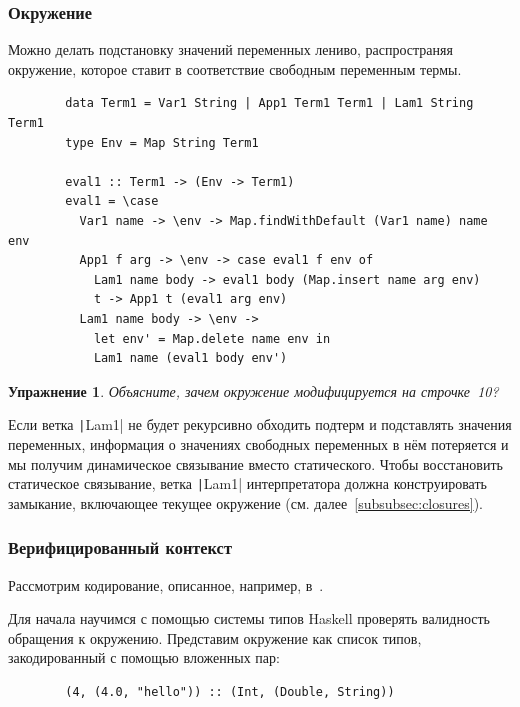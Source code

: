 \documentclass[12pt]{article}
\newtheorem{task}{Упражнение}
\begin{document}
    \subsubsection{Окружение}

    Можно делать подстановку значений переменных лениво, распространяя окружение, которое ставит в соответствие свободным переменным термы.

    \begin{verbatim}
        data Term1 = Var1 String | App1 Term1 Term1 | Lam1 String Term1
        type Env = Map String Term1

        eval1 :: Term1 -> (Env -> Term1)
        eval1 = \case
          Var1 name -> \env -> Map.findWithDefault (Var1 name) name env
          App1 f arg -> \env -> case eval1 f env of
            Lam1 name body -> eval1 body (Map.insert name arg env)
            t -> App1 t (eval1 arg env)
          Lam1 name body -> \env ->
            let env' = Map.delete name env in
            Lam1 name (eval1 body env')
    \end{verbatim}

    \begin{task}
        Объясните, зачем окружение модифицируется на строчке~10?
    \end{task}

    Если ветка \texttt|Lam1| не будет рекурсивно обходить подтерм и подставлять значения переменных, информация о значениях свободных переменных в нём потеряется и мы получим динамическое связывание вместо статического.
    Чтобы восстановить статическое связывание, ветка \texttt|Lam1| интерпретатора должна конструировать замыкание, включающее текущее окружение (см. далее~\ref{subsubsec:closures}).

    \subsubsection{Верифицированный контекст}

    Рассмотрим кодирование, описанное, например, в~\cite{kiselyov2012typed}.

    Для начала научимся с помощью системы типов Haskell проверять валидность обращения к окружению.
    Представим окружение как список типов, закодированный с помощью вложенных пар:
    \begin{verbatim}
        (4, (4.0, "hello")) :: (Int, (Double, String))
    \end{verbatim}
\end{document}
